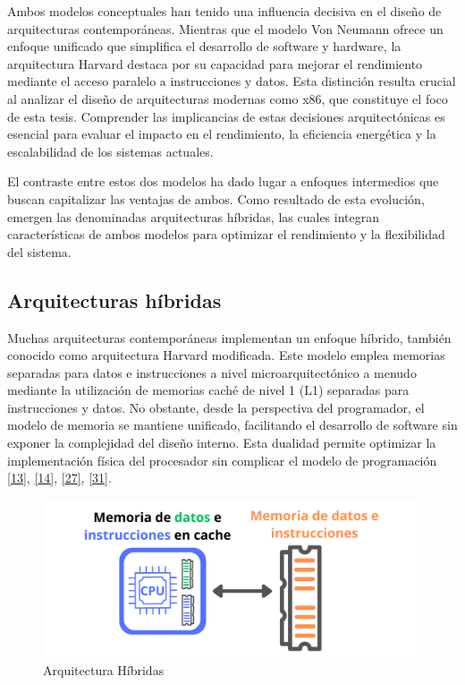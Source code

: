 \documentclass[12pt,oneside]{templates/unerthesis}
\begin{document}
Ambos modelos conceptuales han tenido una influencia decisiva en el diseño de arquitecturas contemporáneas. Mientras que el modelo Von Neumann ofrece un enfoque unificado que simplifica el desarrollo de software y hardware, la arquitectura Harvard destaca por su capacidad para mejorar el rendimiento mediante el acceso paralelo a instrucciones y datos. Esta distinción resulta crucial al analizar el diseño de arquitecturas modernas como x86, que constituye el foco de esta tesis. Comprender las implicancias de estas decisiones arquitectónicas es esencial para evaluar el impacto en el rendimiento, la eficiencia energética y la escalabilidad de los sistemas actuales.

El contraste entre estos dos modelos ha dado lugar a enfoques intermedios que buscan capitalizar las ventajas de ambos. Como resultado de esta evolución, emergen las denominadas arquitecturas híbridas, las cuales integran características de ambos modelos para optimizar el rendimiento y la flexibilidad del sistema.

\hypertarget{arquitecturas-huxedbridas}{%
\subsection{Arquitecturas híbridas}\label{arquitecturas-huxedbridas}}

Muchas arquitecturas contemporáneas implementan un enfoque híbrido, también conocido como arquitectura Harvard modificada. Este modelo emplea memorias separadas para datos e instrucciones a nivel microarquitectónico a menudo mediante la utilización de memorias caché de nivel 1 (L1) separadas para instrucciones y datos. No obstante, desde la perspectiva del programador, el modelo de memoria se mantiene unificado, facilitando el desarrollo de software sin exponer la complejidad del diseño interno. Esta dualidad permite optimizar la implementación física del procesador sin complicar el modelo de programación \protect\hyperlink{ref-hennessy2017computer}{{[}13{]}}, \protect\hyperlink{ref-stallings_computer_2021}{{[}14{]}}, \protect\hyperlink{ref-null_essentials_2023}{{[}27{]}}, \protect\hyperlink{ref-patterson_computer_2017}{{[}31{]}}.

\begin{figure}

{\centering \includegraphics[width=0.85\linewidth]{images/hibrida} 

}

\caption{Arquitectura Híbridas}\label{fig:hibrida}
\end{figure}
\end{document}
